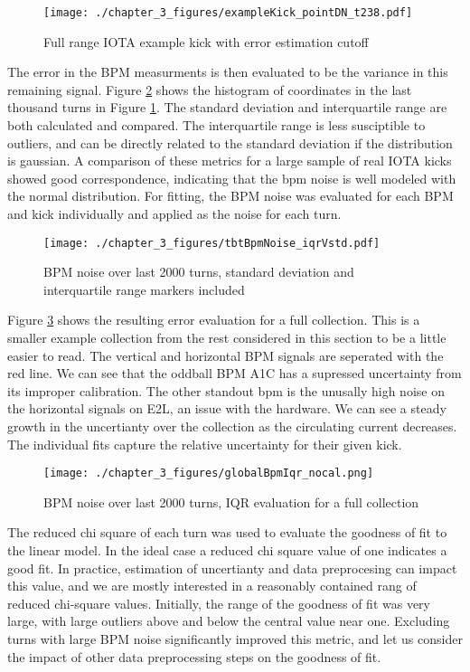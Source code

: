 \begin{figure}
    \centering
    \texttt{[image: ./chapter\_3\_figures/exampleKick\_pointDN\_t238.pdf]}
    \caption{Full range IOTA example kick with error estimation cutoff}
    \label{fig:bpmErrCutoff}
\end{figure}

The error in the BPM measurments is then evaluated to be the variance in this remaining signal. Figure \ref{fig:bpmErrIQR} shows the histogram of coordinates in the last thousand turns in Figure \ref{fig:bpmErrCutoff}. The standard deviation and interquartile range are both calculated and compared. The interquartile range is less susciptible to outliers, and can be directly related to the standard deviation if the distribution is gaussian. A comparison of these metrics for a large sample of real IOTA kicks showed good correspondence, indicating that the bpm noise is well modeled with the normal distribution. For fitting, the BPM noise was evaluated for each BPM and kick individually and applied as the noise for each turn.

\begin{figure}
    \centering
    \texttt{[image: ./chapter\_3\_figures/tbtBpmNoise\_iqrVstd.pdf]}
    \caption{BPM noise over last 2000 turns, standard deviation and interquartile range markers included}
    \label{fig:bpmErrIQR}
\end{figure}

Figure \ref{fig:bpmErrSet} shows the resulting error evaluation for a full collection. This is a smaller example collection from the rest considered in this section to be a little easier to read. The vertical and horizontal BPM signals are seperated with the red line. We can see that the oddball BPM A1C has a supressed uncertainty from its improper calibration. The other standout bpm is the unusally high noise on the horizontal signals on E2L, an issue with the hardware. We can see a steady growth in the uncertianty over the collection as the circulating current decreases. The individual fits capture the relative uncertainty for their given kick.

\begin{figure}
    \centering
    \texttt{[image: ./chapter\_3\_figures/globalBpmIqr\_nocal.png]}
    \caption{BPM noise over last 2000 turns, IQR evaluation for a full collection}
    \label{fig:bpmErrSet}
\end{figure}

The reduced chi square of each turn was used to evaluate the goodness of fit to the linear model. In the ideal case a reduced chi square value of one indicates a good fit. In practice, estimation of uncertianty and data preprocesing can impact this value, and we are mostly interested in a reasonably contained rang of reduced chi-square values. Initially, the range of the goodness of fit was very large, with large outliers above and below the central value near one. Excluding turns with large BPM noise significantly improved this metric, and let us consider the impact of other data preprocessing steps on the goodness of fit.

